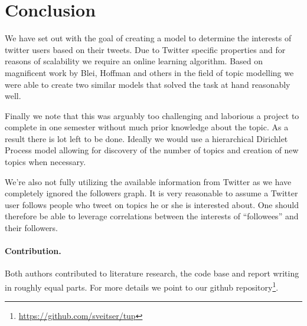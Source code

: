 \section{Conclusion}
We have set out with the goal of creating a model to determine the interests of twitter users based on their tweets. Due to Twitter specific properties and for reasons of scalability we require an online learning algorithm. Based on magnificent work by Blei, Hoffman and others in the field of topic modelling we were able to create two similar models that solved the task at hand reasonably well.

Finally we note that this was arguably too challenging and laborious a project to complete in one semester without much prior knowledge about the topic. As a result there is lot left to be done. Ideally we would use a hierarchical Dirichlet Process model allowing for discovery of the number of topics and creation of new topics when necessary.

We're also not fully utilizing the available information from Twitter as we have completely ignored the followers graph. It is very reasonable to assume a Twitter user follows people who tweet on topics he or she is interested about. One should therefore be able to leverage correlations between the interests of ``followees'' and their followers.

\paragraph{Contribution.}
Both authors contributed to literature research, the code base and report writing in roughly equal parts. For more details we point to our github repository\footnote{\url{https://github.com/sveitser/tup}}.